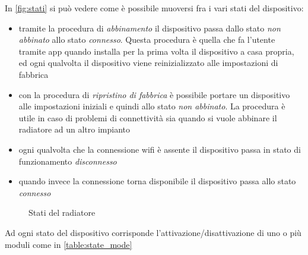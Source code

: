 \documentclass[12pt,a4paper,twoside,titlepage]{book}
\begin{document}
In \autoref{fig:stati} si può vedere come è possibile muoversi fra i vari stati del dispositivo:
\begin{itemize}
    \item tramite la procedura di \textit{abbinamento} il dispositivo passa dallo stato \textit{non abbinato}
        allo stato \textit{connesso}. Questa procedura è quella che fa l'utente tramite app quando installa 
        per la prima volta il dispositivo a casa propria, ed ogni qualvolta il dispositivo viene reinizializzato 
        alle impostazioni di fabbrica 
    \item con la procedura di \textit{ripristino di fabbrica} è possibile portare un dispositivo alle impostazioni 
        iniziali e quindi allo stato \textit{non abbinato}. La procedura è utile in caso di problemi di connettività 
        sia quando si vuole abbinare il radiatore ad un altro impianto
    \item ogni qualvolta che la connessione \Gls{wifi} è assente il dispositivo passa in stato di funzionamento \textit{disconnesso}
    \item quando invece la connessione torna disponibile il dispositivo passa allo stato \textit{connesso}
\end{itemize}

\begin{figure}[ht]
    \centering
    \caption{Stati del radiatore}
    \label{fig:stati}
\end{figure}

Ad ogni stato del dispositivo corrisponde l'attivazione/disattivazione di uno o più
moduli come in \autoref{table:state_mode}
\end{document}
